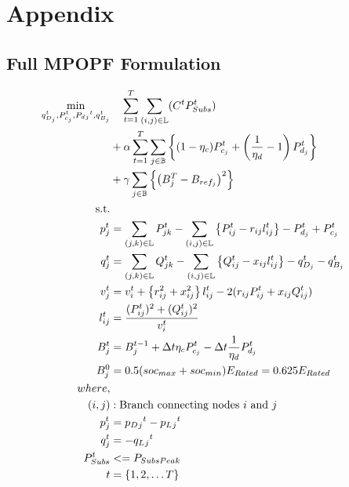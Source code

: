 \newpage

\appendix
\section*{Appendix}
\label{sec:appendix}

% 

\subsection*{Full MPOPF Formulation}
\label{subsec:full-mpopf}

\begin{gather}
	\begin{align}
		\min_{
		\substack{
		q_{D_j}^t, P_{c_j}^t, P_d{_j}^t, q_{B_j}^t}
		} 
		\vspace{-15ex} %
		& \quad
		\sum_{t = 1}^{T} \sum_{(i, j) \in \mathbb{L}} (C^t P^t_{Subs}) \\
		&+ \alpha \sum_{t = 1}^{T} \sum_{j \in \mathbb{B}} \left\{ (1- \eta_c)P_{c_j}^t + \left(\frac{1}{\eta_d}-1\right) P_{d_j}^t \right\} \\
		&+ \gamma \sum_{j \in \mathbb{B}} \left\{ \left(B^{T}_{j} - B_{ref_{j}}\right)^2\right\} \\
		\text{s.t.} & {}\nonumber \\
		{p_j^t} & = {\sum_{(j, k) \in \mathbb{L}} P_{jk}^t - \sum_{(i, j) \in \mathbb{L}}\left\{P_{ij}^t - r_{ij}l_{ij}^t\right\} - P_{d_j}^t + P_{c_j}^t} && \\
		{q_j^t} & = {\sum_{(j, k) \in \mathbb{L}} Q_{jk}^t - \sum_{(i, j) \in \mathbb{L}}\left\{Q_{ij}^t - x_{ij}l_{ij}^t\right\} - q_{D_j}^t - q_{B_j}^t} && \\
		{v_j^t} & = {v_{i}^t +  \left\{r_{ij}^2 + x_{ij}^2\right\}l_{ij}^t - 2(r_{ij}P_{ij}^t + x_{ij}Q_{ij}^t)} && \\
		{l_{ij}^t} & = {\frac{(P_{ij}^{t})^2 + (Q_{ij}^{t})^2}{v_i^t}} \\
		{ B_{j}^{t} } &= { B_{j}^{t-1} + \Delta t  \eta_c P_{c_j}^t - \Delta t\frac{1}{\eta_d} P_{d_j}^t } \\
		{ B_{j}^{0} } &= { 0.5(soc_{max}+soc_{min})E_{Rated} = 0.625E_{Rated}} \\
		{where,} & {} \\
		{(i, j)} &: {\text{Branch connecting nodes $i$ and $j$}} \\
		{p_j^t} &= {p_D{_j}^t - p_L{_j}^t} \\
		{q_j^t} &= {-q_L{_j}^t} \\
		{P_{Subs}^t} &<= {P_{SubsPeak}} \\
		{t} &= {\{1, 2, \ldots T\}}
	\end{align}
\end{gather}